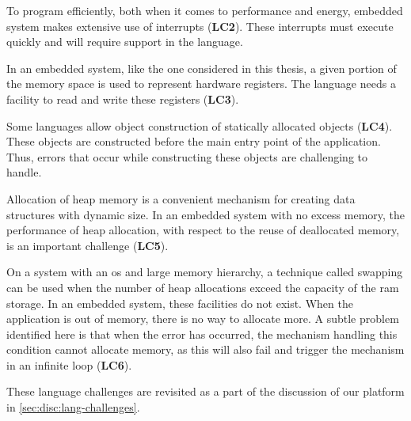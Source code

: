 To program efficiently, both when it comes to performance and energy, embedded system makes extensive use of interrupts (\textbf{LC2}).
These interrupts must execute quickly and will require support in the language.

In an embedded system, like the one considered in this thesis, a given portion of the memory space is used to represent hardware registers.
The language needs a facility to read and write these registers (\textbf{LC3}).

Some languages allow object construction of statically allocated objects (\textbf{LC4}).
These objects are constructed before the main entry point of the application.
Thus, errors that occur while constructing these objects are challenging to handle.

Allocation of heap memory is a convenient mechanism for creating data structures with dynamic size.
In an embedded system with no excess memory, the performance of heap allocation, with respect to the reuse of deallocated memory, is an important challenge (\textbf{LC5}).

On a system with an \gls{os} and large memory hierarchy, a technique called swapping can be used when the number of heap allocations exceed the capacity of the \gls{ram} storage.
In an embedded system, these facilities do not exist.
When the application is out of memory, there is no way to allocate more.
A subtle problem identified here is that when the error has occurred, the mechanism handling this condition cannot allocate memory, as this will also fail and trigger the mechanism in an infinite loop (\textbf{LC6}).

These language challenges are revisited as a part of the discussion of our platform in \autoref{sec:disc:lang-challenges}.
